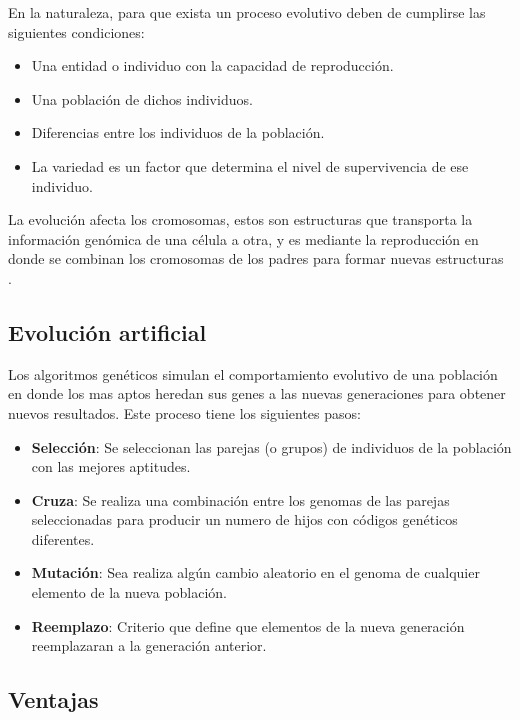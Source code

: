 \documentclass[12pt,twoside]{article}
\begin{document}
	En la naturaleza, para que exista un proceso evolutivo deben de cumplirse las siguientes condiciones:
	\begin{itemize}
		\item Una entidad o individuo con la capacidad de reproducción.
		\item Una población de dichos individuos.
		\item Diferencias entre los individuos de la población.
		\item La variedad es un factor que determina el nivel de supervivencia de ese individuo.
	\end{itemize}
	
	La evolución afecta los cromosomas, estos son estructuras que transporta la información genómica de una célula a otra, y es mediante la reproducción en donde se combinan los cromosomas de los padres para formar nuevas estructuras \cite{evolucion_2, cromosoma}.
	
	\subsection{Evolución artificial}
	
	Los algoritmos genéticos simulan el comportamiento evolutivo de una población en donde los mas aptos heredan sus genes a las nuevas generaciones para obtener nuevos resultados.  Este proceso tiene los siguientes pasos:
	\begin{itemize}
		\item \textbf{Selección}: Se seleccionan las parejas (o grupos) de individuos de la población con las mejores aptitudes.
		
		\item \textbf{Cruza}: Se realiza una combinación entre los genomas de las parejas seleccionadas para producir un numero de hijos con códigos genéticos diferentes.
		
		\item \textbf{Mutación}: Sea realiza algún cambio aleatorio en el genoma de cualquier elemento de la nueva población.
		
		\item \textbf{Reemplazo}: Criterio que define que elementos de la nueva generación reemplazaran a la generación anterior.
	\end{itemize}
		
	\subsection{Ventajas}
	
\end{document}
